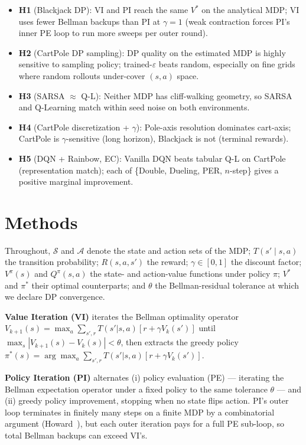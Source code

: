 \documentclass[conference]{IEEEtran}
\begin{document}
\begin{itemize}
\itemsep0em
\item \textbf{H1} (Blackjack DP): VI and PI reach the same $V^*$
on the analytical MDP; VI uses fewer Bellman backups than PI at
$\gamma = 1$ (weak contraction forces PI's inner PE loop to run
more sweeps per outer round).
\item \textbf{H2} (CartPole DP sampling): DP quality on the
estimated MDP is highly sensitive to sampling policy;
trained-$\varepsilon$ beats random, especially on fine grids
where random rollouts under-cover $(s, a)$ space.
\item \textbf{H3} (SARSA $\approx$ Q-L): Neither MDP has
cliff-walking geometry, so SARSA and Q-Learning match within
seed noise on both environments.
\item \textbf{H4} (CartPole discretization + $\gamma$):
Pole-axis resolution dominates cart-axis; CartPole is
$\gamma$-sensitive (long horizon), Blackjack is not (terminal
rewards).
\item \textbf{H5} (DQN + Rainbow, EC): Vanilla DQN beats tabular
Q-L on CartPole (representation match); each of \{Double,
Dueling, PER, $n$-step\} gives a positive marginal improvement.
\end{itemize}


\section{Methods}

Throughout, $\mathcal{S}$ and $\mathcal{A}$ denote the state and action
sets of the MDP; $T(s' \mid s, a)$ the transition probability;
$R(s, a, s')$ the reward; $\gamma \in [0, 1]$ the discount factor;
$V^\pi(s)$ and $Q^\pi(s, a)$ the state- and action-value functions under
policy $\pi$; $V^*$ and $\pi^*$ their optimal counterparts; and $\theta$
the Bellman-residual tolerance at which we declare DP convergence.

\textbf{Value Iteration (VI)} iterates the Bellman optimality operator
$V_{k+1}(s) = \max_a \sum_{s', r} T(s' | s, a)[r + \gamma V_k(s')]$ until
$\max_s |V_{k+1}(s) - V_k(s)| < \theta$, then extracts the greedy policy
$\pi^*(s) = \arg\max_a \sum_{s', r} T(s'|s,a)[r + \gamma V_k(s')]$.

\textbf{Policy Iteration (PI)} alternates (i) policy evaluation (PE) ---
iterating the Bellman expectation operator under a fixed policy to the
same tolerance $\theta$ --- and (ii) greedy policy improvement, stopping
when no state flips action. PI's outer loop terminates in finitely many
steps on a finite MDP by a combinatorial argument
(Howard~\cite{howard1960}), but each outer iteration pays for a full PE
sub-loop, so total Bellman backups can exceed VI's.
\end{document}
